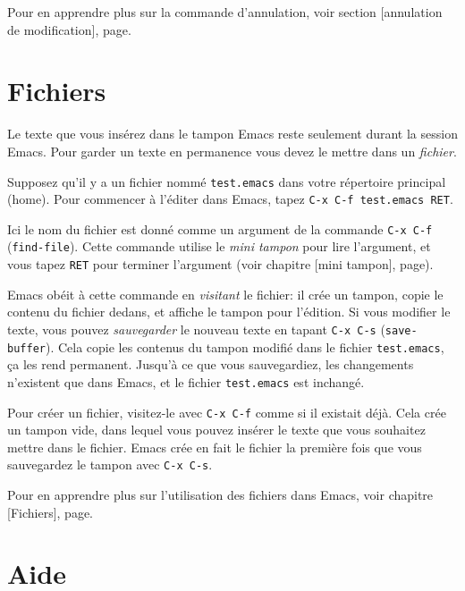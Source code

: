 Pour en apprendre plus sur la commande d'annulation, voir
section [annulation de modification],
page.\par 

\section{Fichiers}

Le texte que vous insérez dans le tampon Emacs reste seulement durant
la session Emacs. Pour garder un texte en permanence vous devez le
mettre dans un \emph{fichier}.\par

Supposez qu'il y a un fichier nommé \texttt{test.emacs} dans votre
répertoire principal (home). Pour commencer à l'éditer dans Emacs,
tapez \texttt{C-x C-f test.emacs RET}.\par

Ici le nom du fichier est donné comme un argument de la commande
\texttt{C-x C-f} (\texttt{find-file}). Cette commande utilise le
\emph{mini tampon} pour lire l'argument, et vous tapez \texttt{RET}
pour terminer l'argument (voir chapitre [mini tampon],
page). \par

Emacs obéit à cette commande en \emph{visitant} le fichier: il crée un
tampon, copie le contenu du fichier dedans, et affiche le tampon pour
l'édition. Si vous modifier le texte, vous pouvez \emph{sauvegarder}
le nouveau texte en tapant \texttt{C-x C-s}
(\texttt{save-buffer}). Cela copie les contenus du tampon modifié dans
le fichier \texttt{test.emacs}, ça les rend permanent. Jusqu'à ce que
vous sauvegardiez, les changements n'existent que dans Emacs, et le
fichier \texttt{test.emacs} est inchangé.\par 

Pour créer un fichier, visitez-le avec \texttt{C-x C-f} comme si il
existait déjà. Cela crée un tampon vide, dans lequel vous pouvez
insérer le texte que vous souhaitez mettre dans le fichier. Emacs crée
en fait le fichier la première fois que vous sauvegardez le tampon
avec \texttt{C-x C-s}.\par 

Pour en apprendre plus sur l'utilisation des fichiers dans Emacs, voir
chapitre [Fichiers], page.\par

\section{Aide}

